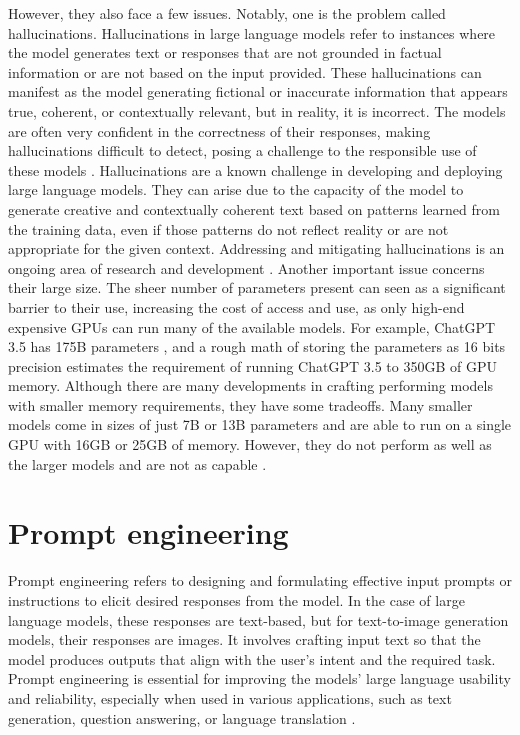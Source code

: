 However, they also face a few issues. Notably, one is the problem called hallucinations. Hallucinations in large language models refer to instances where the model generates text or responses that are not grounded in factual information or are not based on the input provided. These hallucinations can manifest as the model generating fictional or inaccurate information that appears true, coherent, or contextually relevant, but in reality, it is incorrect. The models are often very confident in the correctness of their responses, making hallucinations difficult to detect, posing a challenge to the responsible use of these models \cite{alkaissi2023artificial,azamfirei2023large}. Hallucinations are a known challenge in developing and deploying large language models. They can arise due to the capacity of the model to generate creative and contextually coherent text based on patterns learned from the training data, even if those patterns do not reflect reality or are not appropriate for the given context. Addressing and mitigating hallucinations is an ongoing area of research and development \cite{gunjal2023detecting,mundler2023self,peng2023check}. Another important issue concerns their large size. The sheer number of parameters present can seen as a significant barrier to their use, increasing the cost of access and use, as only high-end expensive GPUs can run many of the available models. For example, ChatGPT 3.5 has 175B parameters \cite{chatgpt-parameters}, and a rough math of storing the parameters as 16 bits precision estimates the requirement of running ChatGPT 3.5 to 350GB of GPU memory. Although there are many developments in crafting performing models with smaller memory requirements, they have some tradeoffs. Many smaller models come in sizes of just 7B or 13B parameters and are able to run on a single GPU with 16GB or 25GB of memory. However, they do not perform as well as the larger models and are not as capable \cite{touvronllama,falcon40b,mpt7b,wizard-vicuna}. 

\section{Prompt engineering}

Prompt engineering refers to designing and formulating effective input prompts or instructions to elicit desired responses from the model. In the case of large language models, these responses are text-based, but for text-to-image generation models, their responses are images. It involves crafting input text so that the model produces outputs that align with the user's intent and the required task. Prompt engineering is essential for improving the models' large language usability and reliability, especially when used in various applications, such as text generation, question answering, or language translation \cite{white2023prompt,zhou2022learning,oppenlaender2022prompt,reynolds2021prompt,zhou-etal-2022-prompt}. 


